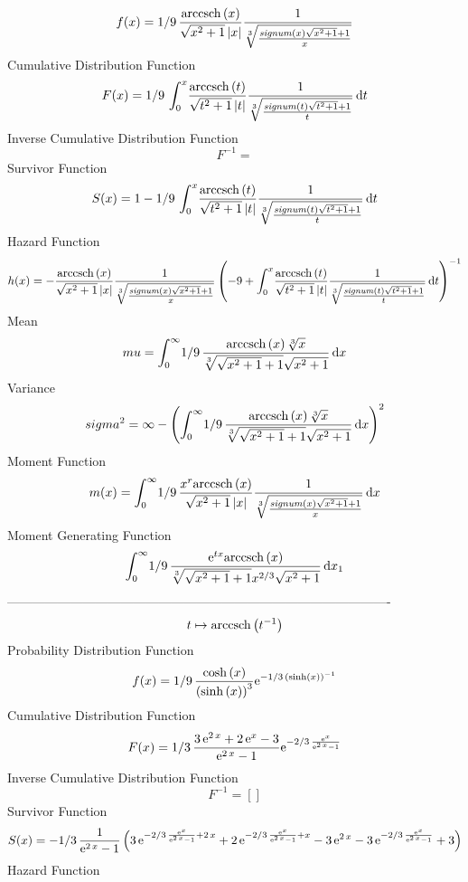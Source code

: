 \documentclass[12pt]{article}
\begin{document}
$$  f(x)=1/9\,{\frac {{\rm arccsch} \left(x\right)}{\sqrt {{x}^{2}+1} \left| x
 \right| }{\frac {1}{\sqrt [3]{{\frac {{\it signum} \left( x \right) 
\sqrt {{x}^{2}+1}+1}{x}}}}}}
$$Cumulative Distribution Function  
 $$F(x)=1/9\,\int_{0}^{x}\!{\frac {{\rm arccsch} \left(t\right)}{\sqrt {{t}^{2
}+1} \left| t \right| }{\frac {1}{\sqrt [3]{{\frac {{\it signum}
 \left( t \right) \sqrt {{t}^{2}+1}+1}{t}}}}}}\,{\rm d}t
$$ Inverse Cumulative Distribution Function 
  $$F^{-1} = $$Survivor Function 
 $$ S(x)=1-1/9\,\int_{0}^{x}\!{\frac {{\rm arccsch} \left(t\right)}{\sqrt {{t}^
{2}+1} \left| t \right| }{\frac {1}{\sqrt [3]{{\frac {{\it signum}
 \left( t \right) \sqrt {{t}^{2}+1}+1}{t}}}}}}\,{\rm d}t
$$ Hazard Function 
 $$ h(x)=-{\frac {{\rm arccsch} \left(x\right)}{\sqrt {{x}^{2}+1} \left| x
 \right| }{\frac {1}{\sqrt [3]{{\frac {{\it signum} \left( x \right) 
\sqrt {{x}^{2}+1}+1}{x}}}}} \left( -9+\int_{0}^{x}\!{\frac {
{\rm arccsch} \left(t\right)}{\sqrt {{t}^{2}+1} \left| t \right| }{
\frac {1}{\sqrt [3]{{\frac {{\it signum} \left( t \right) \sqrt {{t}^{
2}+1}+1}{t}}}}}}\,{\rm d}t \right) ^{-1}}
$$Mean 
 $$ mu=\int_{0}^{\infty }\!1/9\,{\frac {{\rm arccsch} \left(x\right)\sqrt [3]
{x}}{\sqrt [3]{\sqrt {{x}^{2}+1}+1}\sqrt {{x}^{2}+1}}}\,{\rm d}x
$$ Variance 
 $$ sigma^2 = \infty - \left( \int_{0}^{\infty }\!1/9\,{\frac {{\rm arccsch} \left(x
\right)\sqrt [3]{x}}{\sqrt [3]{\sqrt {{x}^{2}+1}+1}\sqrt {{x}^{2}+1}}}
\,{\rm d}x \right) ^{2}
$$Moment Function 
 $$ m(x) = \int_{0}^{\infty }\!1/9\,{\frac {{x}^{r}{\rm arccsch} \left(x\right)}{
\sqrt {{x}^{2}+1} \left| x \right| }{\frac {1}{\sqrt [3]{{\frac {{\it 
signum} \left( x \right) \sqrt {{x}^{2}+1}+1}{x}}}}}}\,{\rm d}x
$$ Moment Generating Function 
 $$\int_{0}^{\infty }\!1/9\,{\frac {{{\rm e}^{tx}}{\rm arccsch} \left(x
\right)}{\sqrt [3]{\sqrt {{x}^{2}+1}+1}{x}^{2/3}\sqrt {{x}^{2}+1}}}
\,{\rm d}x_{{1}}
$$-------------------------------------------------------------------------------------------  \\$$t\mapsto {\rm arccsch} \left({t}^{-1}\right)
$$Probability Distribution Function 
$$  f(x)=1/9\,{\frac {\cosh \left( x \right) }{ \left( \sinh \left( x \right) 
 \right) ^{3}}{{\rm e}^{-1/3\, \left( \sinh \left( x \right)  \right) 
^{-1}}}}
$$Cumulative Distribution Function  
 $$F(x)=1/3\,{\frac {3\,{{\rm e}^{2\,x}}+2\,{{\rm e}^{x}}-3}{{{\rm e}^{2\,x}}-
1}{{\rm e}^{-2/3\,{\frac {{{\rm e}^{x}}}{{{\rm e}^{2\,x}}-1}}}}}
$$ Inverse Cumulative Distribution Function 
  $$F^{-1} = []
$$Survivor Function 
 $$ S(x)=-1/3\,{\frac {1}{{{\rm e}^{2\,x}}-1} \left( 3\,{{\rm e}^{-2/3\,{\frac 
{{{\rm e}^{x}}}{{{\rm e}^{2\,x}}-1}}+2\,x}}+2\,{{\rm e}^{-2/3\,{\frac 
{{{\rm e}^{x}}}{{{\rm e}^{2\,x}}-1}}+x}}-3\,{{\rm e}^{2\,x}}-3\,{
{\rm e}^{-2/3\,{\frac {{{\rm e}^{x}}}{{{\rm e}^{2\,x}}-1}}}}+3
 \right) }
$$ Hazard Function 
\end{document}

